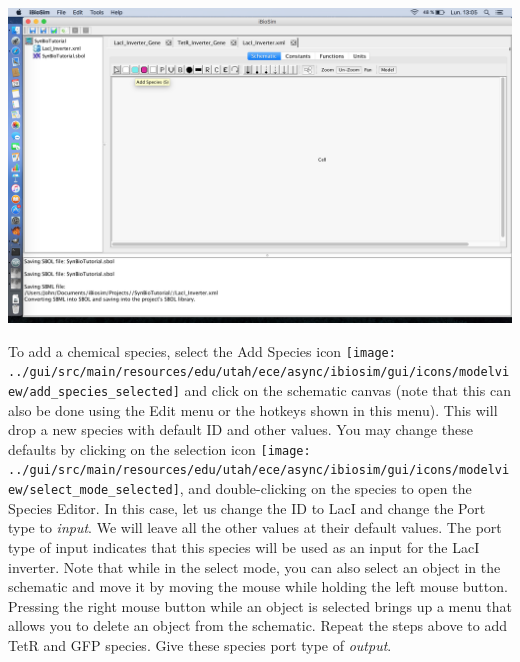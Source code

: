 \documentclass[titlepage,11pt]{article}
\begin{document}
\begin{center}
\includegraphics[width=160mm]{screenshots/schematicGT}
\end{center}

To add a chemical species, select the Add Species icon \texttt{[image: ../gui/src/main/resources/edu/utah/ece/async/ibiosim/gui/icons/modelview/add\_species\_selected]} and click on the schematic canvas  (note that this can also be done using the Edit menu or the hotkeys shown in this menu).  This will drop a new species with default ID and other values.  You may change these defaults by clicking on the selection icon 
\texttt{[image: ../gui/src/main/resources/edu/utah/ece/async/ibiosim/gui/icons/modelview/select\_mode\_selected]}, and
double-clicking on the species to open the Species Editor.  In this case, let us change the ID to LacI and change the Port type to \emph{input}.  We will leave all the other values at their default values.  The port type of input indicates that this species will be used as an input for the LacI inverter.   
Note that while in the select mode, you can also select an object in the schematic and move it by moving the mouse while holding the left mouse button.  Pressing the right mouse button while an object is selected brings up a menu that allows you to delete an object from the schematic.  Repeat the steps above to add TetR and GFP species.  Give these species port type of \emph{output}. 
\end{document}
